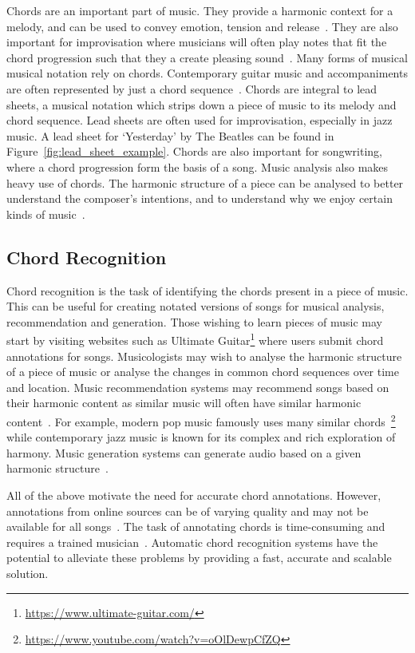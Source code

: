 Chords are an important part of music. They provide a harmonic context for a melody, and can be used to convey emotion, tension and release~\citep{HarmonyandVoiceLeading}. They are also important for improvisation where musicians will often play notes that fit the chord progression such that they a create pleasing sound~\citep{JazzTheoryBook}. Many forms of musical musical notation rely on chords. Contemporary guitar music and accompaniments are often represented by just a chord sequence~\cite{GuitarChordBible}. Chords are integral to lead sheets, a musical notation which strips down a piece of music to its melody and chord sequence. Lead sheets are often used for improvisation, especially in jazz music. A lead sheet for `Yesterday' by The Beatles can be found in Figure~\ref{fig:lead_sheet_example}. Chords are also important for songwriting, where a chord progression form the basis of a song. Music analysis also makes heavy use of chords. The harmonic structure of a piece can be analysed to better understand the composer's intentions, and to understand why we enjoy certain kinds of music~\citep{TonalAnalysisBach}.

\subsection{Chord Recognition}

Chord recognition is the task of identifying the chords present in a piece of music. This can be useful for creating notated versions of songs for musical analysis, recommendation and generation. Those wishing to learn pieces of music may start by visiting websites such as Ultimate Guitar\footnote{\url{https://www.ultimate-guitar.com/}} where users submit chord annotations for songs. Musicologists may wish to analyse the harmonic structure of a piece of music or analyse the changes in common chord sequences over time and location. Music recommendation systems may recommend songs based on their harmonic content as similar music will often have similar harmonic content~\citep{MusicGenreClassification}. For example, modern pop music famously uses many similar chords~\footnote{\url{https://www.youtube.com/watch?v=oOlDewpCfZQ}} while contemporary jazz music is known for its complex and rich exploration of harmony. Music generation systems can generate audio based on a given harmonic structure~\citep{MusicGenChord}.

All of the above motivate the need for accurate chord annotations. However, annotations from online sources can be of varying quality and may not be available for all songs~\citep{Choco}. The task of annotating chords is time-consuming and requires a trained musician~\citep{McgillBillboard}. Automatic chord recognition systems have the potential to alleviate these problems by providing a fast, accurate and scalable solution.

